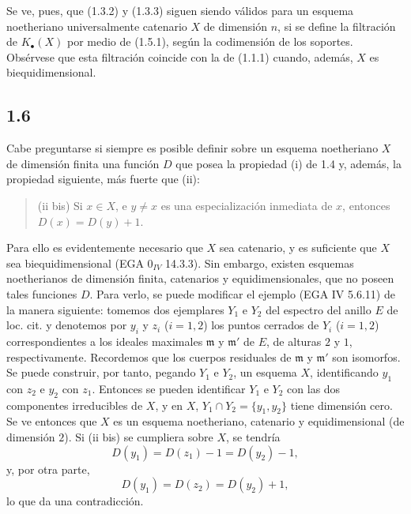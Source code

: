 \providecommand{\sisi}[2]{#2}

Se ve, pues, que (1.3.2) y (1.3.3) siguen siendo válidos para un esquema noetheriano universalmente catenario $X$ de dimensión $n$, si se define la filtración de $K_\bullet(X)$ por medio de (1.5.1), según la codimensión de los soportes. Obsérvese que esta filtración coincide con la de (1.1.1) cuando, además, $X$ es biequidimensional.

\subsection*{1.6}
Cabe preguntarse si siempre es posible definir sobre un esquema noetheriano $X$ de dimensión finita una función $D$ que posea la propiedad (i) de 1.4 y, además, la propiedad siguiente, más fuerte que (ii):
\begin{quote}
(ii bis) Si $x\in X$, e $y\ne x$ es una especialización inmediata de $x$, entonces $D(x)=D(y)+1$.
\end{quote}
Para ello es evidentemente necesario que $X$ sea catenario, y es suficiente que $X$ sea biequidimensional (EGA $0_{IV}$ 14.3.3). Sin embargo, existen esquemas noetherianos de dimensión finita, catenarios y equidimensionales, que no poseen tales funciones $D$. Para verlo, se puede modificar el ejemplo (EGA IV 5.6.11) de la manera siguiente: tomemos dos ejemplares $Y_1$ e $Y_2$ del espectro del anillo $E$ de loc. cit. y denotemos por $y_i$ y $z_i$ ($i=1,2$) los puntos cerrados de $Y_i$ ($i=1,2$) correspondientes a los ideales maximales $\mathfrak m$ y $\mathfrak m'$ de $E$, de alturas $2$ y $1$, respectivamente. Recordemos que los cuerpos residuales de $\mathfrak m$ y $\mathfrak m'$ son isomorfos. Se puede construir, por tanto, pegando $Y_1$ e $Y_2$, un esquema $X$, identificando $y_1$ con $z_2$ e $y_2$ con $z_1$. Entonces se pueden identificar $Y_1$ e $Y_2$ con las dos componentes irreducibles de $X$, y en \sisi{$Z$}{$X$}, $Y_1\cap Y_2=\{y_1,y_2\}$ tiene dimensión cero. Se ve entonces que $X$ es un esquema noetheriano, catenario y equidimensional (de dimensión $2$). Si (ii bis) se cumpliera sobre $X$, se tendría
\[
D(y_1)=D(z_1)-1=D(y_2)-1,
\]
y, por otra parte,
\[
D(y_1)=D(z_2)=D(y_2)+1,
\]
lo que da una contradicción.
